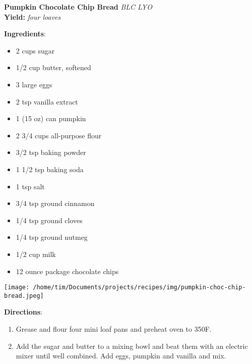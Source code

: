 \documentclass[11pt, twoside, openany]{book}
\begin{document}
\noindent\begin{minipage}[t]{\linewidth}%
{\Large\textbf{Pumpkin Chocolate Chip Bread}} \label{pumpkin-chocolate-chip-bread}\hfill\textit{BLC LYO}\\
\textbf{Yield:} \textit{four loaves}\\
\noindent\begin{minipage}[t]{0.78\linewidth}%
\textbf{Ingredients}:\vspace{-3mm}
\begin{multicols}{2}
\begin{itemize}\setlength\itemsep{-1mm}
\item 2 cups sugar
\item 1/2 cup butter, softened
\item 3 large eggs
\item 2 tsp vanilla extract
\item 1 (15 oz) can pumpkin
\item 2 3/4 cups all-purpose flour
\item 3/2 tsp baking powder
\item 1 1/2 tsp baking soda
\item 1 tsp salt
\item 3/4 tsp ground cinnamon
\item 1/4 tsp ground cloves
\item 1/4 tsp ground nutmeg
\item 1/2 cup milk
\item 12 ounce package chocolate chips
\end{itemize}
\end{multicols}
\end{minipage}
\noindent\begin{minipage}[t]{0.18\linewidth}
\centering \strut\vspace*{-\baselineskip}\newline
\texttt{[image: /home/tim/Documents/projects/recipes/img/pumpkin-choc-chip-bread.jpeg]}\\
\end{minipage}\vspace{3mm}
\textbf{Directions}:
\vspace{-3mm}\begin{enumerate}\setlength\itemsep{-1mm}
\item Grease and flour four mini loaf pans and preheat oven to 350F.
\item Add the sugar and butter to a mixing bowl and beat them with an electric mixer until well combined. Add eggs, pumpkin and vanilla and mix.

\end{enumerate}
\end{minipage}
\end{document}
